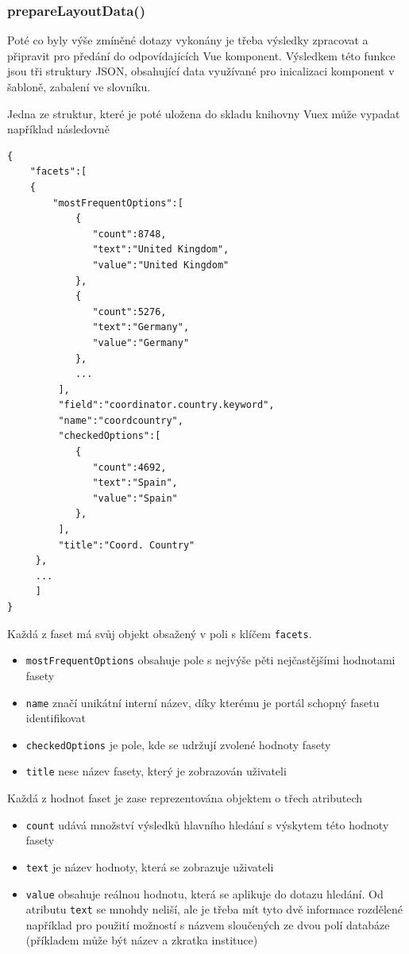 \subsubsection*{prepareLayoutData()}
Poté co byly výše zmíněné dotazy vykonány je třeba výsledky zpracovat a připravit pro předání do odpovídajících Vue komponent. Výsledkem této funkce jsou tři struktury JSON, obsahující data využívané pro inicalizaci komponent v šabloně, zabalení ve slovníku.

Jedna ze struktur, které je poté uložena do skladu knihovny Vuex může vypadat například následovně

\begin{verbatim}
{
    "facets":[
    {
        "mostFrequentOptions":[  
            {  
               "count":8748,
               "text":"United Kingdom",
               "value":"United Kingdom"
            },
            {  
               "count":5276,
               "text":"Germany",
               "value":"Germany"
            },
            ...
         ],
         "field":"coordinator.country.keyword",
         "name":"coordcountry",
         "checkedOptions":[  
            {  
               "count":4692,
               "text":"Spain",
               "value":"Spain"
            },
         ],
         "title":"Coord. Country"
     },
     ...
     ]
}
\end{verbatim}
Každá z faset má svůj objekt obsažený v poli s klíčem \texttt{facets}.
\begin{itemize}
\item \texttt{mostFrequentOptions} obsahuje pole s nejvýše pěti nejčastějšími hodnotami fasety
\item \texttt{name} značí unikátní interní název, díky kterému je portál schopný fasetu identifikovat
\item \texttt{checkedOptions} je pole, kde se udržují zvolené hodnoty fasety
\item \texttt{title} nese název fasety, který je zobrazován uživateli
\end{itemize}
Každá z hodnot faset je zase reprezentována objektem o třech atributech
\begin{itemize}
\item \texttt{count} udává množství výsledků hlavního hledání s výskytem této hodnoty fasety
\item \texttt{text} je název hodnoty, která se zobrazuje uživateli
\item \texttt{value} obsahuje reálnou hodnotu, která se aplikuje do dotazu hledání. Od atributu \texttt{text} se mnohdy neliší, ale je třeba mít tyto dvě informace rozdělené například pro použití možností s názvem sloučených ze dvou polí databáze (příkladem může být název a zkratka instituce)
\end{itemize}

